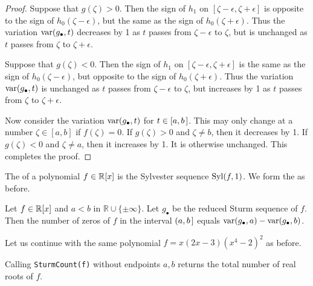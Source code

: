 \begin{proof}
 Suppose that $g(\zeta)>0$.
 Then the sign of $h_1$ on $[\zeta-\epsilon,\zeta+\epsilon]$ is opposite to the sign of $h_0(\zeta-\epsilon)$, but the same as the sign of
 $h_0(\zeta+\epsilon)$.
 Thus the variation $\operatorname{{\rm var}}(g_\bullet,t)$ decreases by 1 as $t$ passes from $\zeta{-}\epsilon$ to $\zeta$, but is unchanged as $t$
 passes from $\zeta$ to $\zeta{+}\epsilon$.
  

 Suppose that $g(\zeta)<0$.
 Then the sign of $h_1$ on $[\zeta-\epsilon,\zeta+\epsilon]$ is the same as the sign of $h_0(\zeta-\epsilon)$, but opposite to the sign of
 $h_0(\zeta+\epsilon)$.
 Thus the variation $\operatorname{{\rm var}}(g_\bullet,t)$ is unchanged as $t$ passes from $\zeta-\epsilon$ to $\zeta$, but increases by 1 as $t$ 
 passes from $\zeta$ to $\zeta+\epsilon$.

 Now consider the variation $\operatorname{{\rm var}}(g_\bullet,t)$ for $t\in[a,b\hspace{.05cm}]$.
 This may only change at a number $\zeta\in[a,b]$ if $f(\zeta)=0$.
 If $g(\zeta)>0$ and $\zeta\neq b$, then it decreases by 1.
 If $g(\zeta)<0$ and $\zeta\neq a$, then it increases by 1.
 It is otherwise unchanged.
 This completes the proof.
 \end{proof}

The  of a polynomial $f\in\mathbb{R}[x]$ is the Sylvester sequence $\operatorname{{\rm Syl}}(f,1)$.
We form the  as before.

\begin{corollary}
  Let $f\in\mathbb{R}[x]$ and $a<b$ in $\mathbb{R}\cup\{\pm\infty\}$.
  Let $g_\bullet$ be the reduced Sturm sequence of $f$.
  Then the number of zeros of $f$ in the interval $(a,b\hspace{.05cm}]$ equals  $\operatorname{{\rm var}}(g_\bullet,a) - \operatorname{{\rm var}}(g_\bullet,b)$.
\end{corollary}

Let us continue with the same polynomial $f=x(2x-3)(x^4-2)^2$ as before.
%
\begin{leftbar}

\end{leftbar}
%
Calling {\tt SturmCount(f)} without endpoints $a,b$ returns the total number of real roots of $f$.

